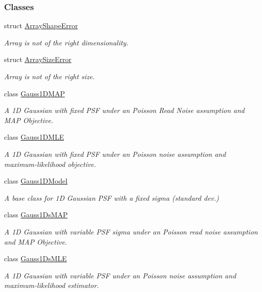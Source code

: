 \subsubsection*{Classes}
\begin{DoxyCompactItemize}
\item 
struct \hyperlink{structmappel_1_1ArrayShapeError}{Array\+Shape\+Error}
\begin{DoxyCompactList}\small\item\em Array is not of the right dimensionality. \end{DoxyCompactList}\item 
struct \hyperlink{structmappel_1_1ArraySizeError}{Array\+Size\+Error}
\begin{DoxyCompactList}\small\item\em Array is not of the right size. \end{DoxyCompactList}\item 
class \hyperlink{classmappel_1_1Gauss1DMAP}{Gauss1\+D\+M\+AP}
\begin{DoxyCompactList}\small\item\em A 1D Gaussian with fixed P\+SF under an Poisson Read Noise assumption and M\+AP Objective. \end{DoxyCompactList}\item 
class \hyperlink{classmappel_1_1Gauss1DMLE}{Gauss1\+D\+M\+LE}
\begin{DoxyCompactList}\small\item\em A 1D Gaussian with fixed P\+SF under an Poisson noise assumption and maximum-\/likelihood objective. \end{DoxyCompactList}\item 
class \hyperlink{classmappel_1_1Gauss1DModel}{Gauss1\+D\+Model}
\begin{DoxyCompactList}\small\item\em A base class for 1D Gaussian P\+SF with a fixed sigma (standard dev.) \end{DoxyCompactList}\item 
class \hyperlink{classmappel_1_1Gauss1DsMAP}{Gauss1\+Ds\+M\+AP}
\begin{DoxyCompactList}\small\item\em A 1D Gaussian with variable P\+SF sigma under an Poisson read noise assumption and M\+AP Objective. \end{DoxyCompactList}\item 
class \hyperlink{classmappel_1_1Gauss1DsMLE}{Gauss1\+Ds\+M\+LE}
\begin{DoxyCompactList}\small\item\em A 1D Gaussian with variable P\+SF under an Poisson noise assumption and maximum-\/likelihood estimator. \end{DoxyCompactList}\item 

\end{DoxyCompactItemize}
